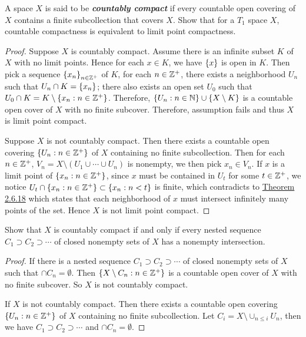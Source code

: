 \documentclass[12pt,a4paper]{article}
\begin{document}
    \begin{ex}
        A space $X$ is said to be \textbf{\textit{countably compact}} if every countable open covering of $X$ contains a finite subcollection that covers $X$. Show that for a $T_1$ space $X$, countable compactness is equivalent to limit point compactness.
    \end{ex}
    \begin{proof}
        Suppose $X$ is countably compact. Assume there is an infinite subset $K$ of $X$ with no limit points. Hence for each $x\in K$, we have $\left\{x\right\}$ is open in $K$. Then pick a sequence $\left\{x_n\right\}_{n\in\mathbb{Z}^+}$ of $K$, for each $n\in\mathbb{Z}^+$, there exists a neighborhood $U_n$ such that $U_n\cap K=\left\{x_n\right\}$; there also exists an open set $U_0$ such that $U_0\cap K=K\setminus\left\{x_n:n\in\mathbb{Z}^+\right\}$. Therefore, $\left\{U_n:n\in\mathbb{N}\right\}\cup\left\{X\setminus K\right\}$ is a countable open cover of $X$ with no finite subcover. Therefore, assumption fails and thus $X$ is limit point compact.
        
        Suppose $X$ is not countably compact. Then there exists a countable open covering $\left\{U_n:n\in\mathbb{Z}^+\right\}$ of $X$ containing no finite subcollection. Then for each $n\in\mathbb{Z}^+$, $V_n=X\setminus(U_1\cup\cdots\cup U_n)$ is nonempty, we then pick $x_n\in V_n$. If $x$ is a limit point of $\left\{x_n:n\in\mathbb{Z}^+\right\}$, since $x$ must be contained in $U_t$ for some $t\in\mathbb{Z}^+$, we notice $U_t\cap\left\{x_n:n\in\mathbb{Z}^+\right\}\subset\left\{x_n:n<t\right\}$ is finite, which contradicts to \hyperref[2.6.18]{Theorem 2.6.18} which states that each neighborhood of $x$ must intersect infinitely many points of the set. Hence $X$ is not limit point compact.
    \end{proof}
    \hfill

    \begin{ex}
        Show that $X$ is countably compact if and only if every nested sequence $C_1\supset C_2\supset\cdots$ of closed nonempty sets of $X$ has a nonempty intersection.
    \end{ex}
    \begin{proof}
        If there is a nested sequence $C_1\supset C_2\supset\cdots$ of closed nonempty sets of $X$ such that $\cap C_n=\emptyset$. Then $\left\{X\setminus C_n:n\in\mathbb{Z}^+\right\}$ is a countable open cover of $X$ with no finite subcover. So $X$ is not countably compact.

        If $X$ is not countably compact. Then there exists a countable open covering $\left\{U_n:n\in\mathbb{Z}^+\right\}$ of $X$ containing no finite subcollection. Let $C_i=X\setminus\cup_{n\leq i}U_n$, then we have $C_1\supset C_2\supset\cdots$ and $\cap C_n=\emptyset$.
    \end{proof}
    \hfill
\end{document}
